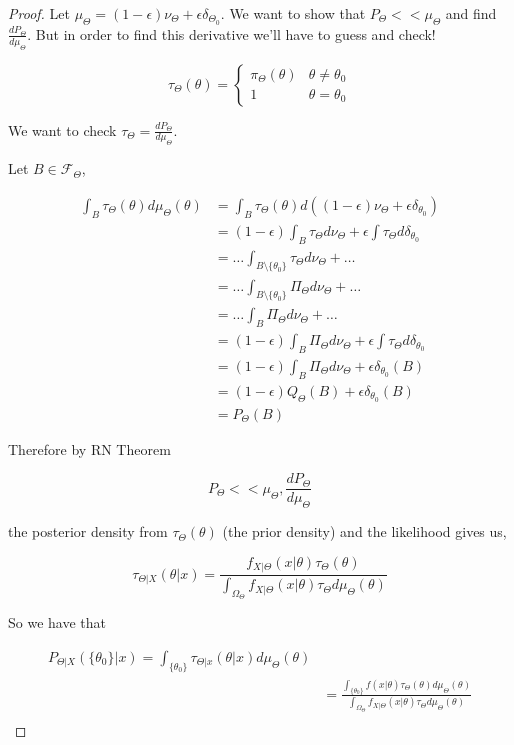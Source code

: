 \documentclass[11pt,fleqn]{book} %
\begin{document}
\begin{proof}
	Let $\mu_\Theta = (1 - \epsilon) \nu_\Theta + \epsilon \delta_{\Theta_0}$. We want to show that $P_\Theta << \mu_\Theta$ and find $\frac{d P_\Theta}{d \mu_\Theta}$. But in order to find this derivative we'll have to guess and check!


			$$\tau_\Theta(\theta) = \left\{ \begin{array}{ll}
				\pi_\Theta(\theta) & \theta \neq \theta_0\\
				1 & \theta = \theta_0
			\end{array} \right.$$

	We want to check  $\tau_\Theta = \frac{d P_\Theta}{d \mu_\Theta}$. 

	Let $B \in \mathcal{F}_\Theta$, 

	\begin{align*}
		\int_B \tau_\Theta(\theta) d\mu_\Theta(\theta) &= \int_B \tau_\Theta(\theta) d((1 - \epsilon) \nu_\Theta + \epsilon \delta_{\theta_0})\\
			&=(1 - \epsilon)\int_B \tau_\Theta d \nu_\Theta + \epsilon\int \tau_\Theta d \delta_{\theta_0}\\
			&=\dots\int_{B \setminus \{\theta_0\}} \tau_\Theta d \nu_\Theta + \dots\\
			&=\dots \int_{B \setminus \{\theta_0\}} \Pi_\Theta d \nu_\Theta + \dots\\
			&=\dots \int_{B} \Pi_\Theta d \nu_\Theta + \dots\\
			&=(1 - \epsilon)\int_{B} \Pi_\Theta d \nu_\Theta + \epsilon\int \tau_\Theta d \delta_{\theta_0}\\
			&= (1 - \epsilon)\int_{B} \Pi_\Theta d \nu_\Theta + \epsilon \delta_{\theta_0} (B)\\
			&= (1 - \epsilon) Q_\Theta(B) + \epsilon \delta_{\theta_0}(B)\\
			&= P_\Theta(B)
	\end{align*}

	Therefore by RN Theorem 

			$$P_\Theta << \mu_\Theta, \frac{d P_\Theta}{d \mu_\Theta}$$


	the posterior density from $\tau_\Theta(\theta)$ (the prior density) and the likelihood gives us, 

			$$\tau_{\Theta|X}(\theta|x) = \frac{f_{X|\Theta}(x|\theta) \tau_\Theta(\theta)}{\int_{\Omega_\Theta} f_{X|\Theta}(x|\theta) \tau_\Theta d \mu_\Theta(\theta)} $$

	So we have that 

		\begin{align*}
			P_{\Theta|X}(\{\theta_0\}|x) = \int_{\{\theta_0\}} \tau_{\Theta|x}(\theta|x) d\mu_\Theta(\theta) \\
				&=  \frac{\int_{\{\theta_0\}} f(x|\theta) \tau_{\Theta}(\theta) d\mu_\Theta(\theta)}{\int_{\Omega_\Theta} f_{X|\Theta}(x|\theta) \tau_\Theta d \mu_\Theta(\theta)} \\
		\end{align*}


\end{proof}
\end{document}
